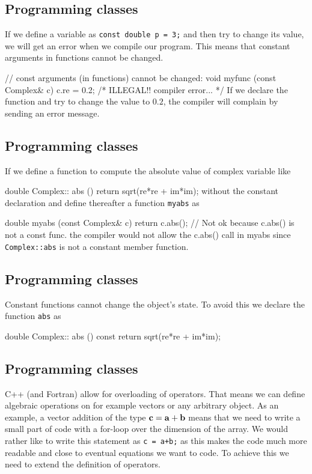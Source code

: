 \documentclass[%
oneside,                 %
final,                   %
10pt]{article}
\begin{document}
{{{{{{{{{{{{{{%
\subsection{Programming classes}

If we define a variable as
\Verb!const double p = 3;! and then try to change its value, we will get an error when we
compile our program. This means that constant arguments in functions cannot be changed.

\bcppcod
// const arguments (in functions) cannot be changed:
void myfunc (const Complex& c)
{ c.re = 0.2; /* ILLEGAL!! compiler error... */  }
\ecppcod
If we declare the function and try to change the value to $0.2$, the compiler will complain by sending
an error message.

\subsection{Programming classes}

If we define a function to compute the absolute value of complex variable like

\bcppcod
double Complex:: abs ()  { return sqrt(re*re + im*im);}
\ecppcod
without the constant declaration  and define thereafter a function
\Verb!myabs! as

\bcppcod
double myabs (const Complex& c)
{ return c.abs(); }   // Not ok because c.abs() is not a const func.
\ecppcod
the compiler would not allow the c.abs() call in myabs
since \Verb!Complex::abs! is not a constant member function.

\subsection{Programming classes}

Constant functions cannot change the object's state.
To avoid this we declare the function \Verb!abs! as

\bcppcod
double Complex:: abs () const { return sqrt(re*re + im*im); }
\ecppcod

\subsection{Programming classes}

C++ (and Fortran) allow for overloading of operators. That means we
can define algebraic operations on for example vectors or any
arbitrary object.  As an example, a vector addition of the type ${\bf
c} = {\bf a} + {\bf b}$ means that we need to write a small part of
code with a for-loop over the dimension of the array.  We would rather
like to write this statement as \Verb!c = a+b;! as this makes the code much
more readable and close to eventual equations we want to code.  To
achieve this we need to extend the definition of operators.

}}}}}}}}}}}}}}
\end{document}
